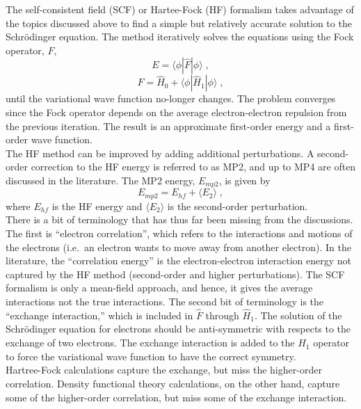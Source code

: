 \documentclass[12pt]{report}
\begin{document}
The self-consistent field (SCF) or Hartee-Fock (HF) formalism takes advantage
of the topics discussed above to find a simple but relatively accurate
solution to the Schr\"{o}dinger equation.
The method iteratively solves the equations using the Fock operator, $F$,
\begin{equation}
 E = \langle\phi|\hat F|\phi\rangle \; ,
\end{equation}
\begin{equation}
 \hat F = \hat H_0+\langle\phi|\hat H_1|\phi\rangle \; ,
\end{equation}
until the variational wave function no-longer changes.
The problem converges since the Fock operator depends on the average
electron-electron repulsion from the previous iteration.
The result is an approximate first-order energy and a first-order wave
function. \\

The HF method can be improved by adding additional perturbations.
A second-order correction to the HF energy is referred to as MP2, and up to
MP4 are often discussed in the literature.
The MP2 energy, $E_{mp2}$, is given by
\begin{equation}
 E_{mp2} = E_{hf} + \langle E_{2} \rangle \; ,
\end{equation}
where $E_{hf}$ is the HF energy and $\langle E_2 \rangle$ is the second-order
perturbation. \\

There is a bit of terminology that has thus far been missing from the
discussions.
The first is ``electron correlation'', which refers to the interactions and
motions of the electrons (i.e.\ an electron wants to move away from another
electron).
In the literature, the ``correlation energy'' is the electron-electron
interaction energy not captured by the HF method (second-order and higher
perturbations).
The SCF formalism is only a mean-field approach, and hence, it gives the
average interactions not the true interactions.
The second bit of terminology is the ``exchange interaction,'' which is 
included in $\hat F$ through $\hat H_1$.
The solution of the Schr\"{o}dinger equation for electrons should be
anti-symmetric with respects to the exchange of two electrons.
The exchange interaction is added to the $\hat H_1$ operator to force the
variational wave function to have the correct symmetry. \\

Hartree-Fock calculations capture the exchange, but miss the higher-order
correlation.
Density functional theory calculations, on the other hand, capture some of the
higher-order correlation, but miss some of the exchange interaction.
\end{document}
